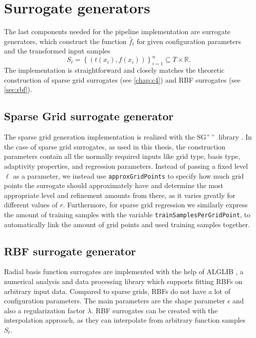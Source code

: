 \documentclass[
  a4paper,  %
  twoside,  %
  bibliography=totoc,
  headsepline,
  cleardoublepage=empty,
  parskip=half,
  draft=false
]{scrbook}
\begin{document}
\newpage

\section {Surrogate generators}
\label{sec:sg}

The last components needed for the pipeline implementation are surrogate generators, which construct the function $\hat{f}_t$ for given configuration parameters and the transformed input samples
\begin{equation}
S_t=\left\{(t(x_i), f(x_i))\right\}_{i=1}^n \subseteq T \times \mathds{R}.
\end{equation}
The implementation is straightforward and closely matches the theoretic construction of sparse grid surrogates (see \cref{chap:c4}) and RBF surrogates (see \cref{sec:rbf}).

\subsection {Sparse Grid surrogate generator}

The sparse grid generation implementation is realized with the $\mathrm{SG}^{++}$ library \cite{Pflueger2010}.
In the case of sparse grid surrogates, as used in this thesis, the construction parameters contain all the normally required inputs like grid type, basis type, adaptivity properties, and regression parameters.
Instead of passing a fixed level $\ell$ as a parameter, we instead use \texttt{approxGridPoints} to specify how much grid points the surrogate should approximately have and determine the most appropriate level and refinement amounts from there, as it varies greatly for different values of $r$.
Furthermore, for sparse grid regression we similarly express the amount of training samples with the variable \texttt{trainSamplesPerGridPoint}, to automatically link the amount of grid points and used training samples together.

\subsection {RBF surrogate generator}

Radial basis function surrogates are implemented with the help of ALGLIB \cite{Bochkanov}, a numerical analysis and data processing library which supports fitting RBFs on arbitrary input data.
Compared to sparse grids, RBFs do not have a lot of configuration parameters.
The main parameters are the shape parameter $\epsilon$ and also a regularization factor $\lambda$.
RBF surrogates can be created with the interpolation approach, as they can interpolate from arbitrary function samples $S_t$.
\end{document}
